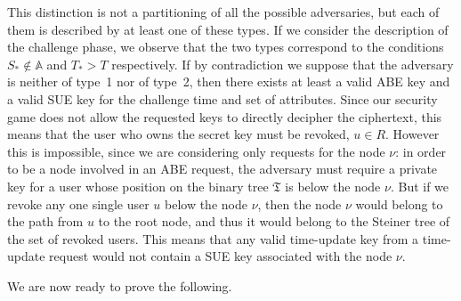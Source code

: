 \documentclass[a4paper,10pt]{article}
\newcommand{\tree}{\mathfrak{T}}
\newcommand{\typeone}{type~1}
\newcommand{\typetwo}{type~2}
\begin{document}
	This distinction is not a partitioning of all the possible adversaries, but each of them is described by at least one of these types. If we consider the description of the challenge phase, we observe that the two types correspond to the conditions $S_*\not\in\mathbb{A}$ and $T_*>T$ respectively. If by contradiction we suppose that the adversary is neither of \typeone{} nor of \typetwo{}, then there exists at least a valid ABE key and a valid SUE key for the challenge time and set of attributes. Since our security game does not allow the requested keys to directly decipher the ciphertext, this means that the user who owns the secret key must be revoked, $u\in R$. However this is impossible, since we are considering only requests for the node $\nu$: in order to be a node involved in an ABE request, the adversary must require a private key for a user whose position on the binary tree $\tree$ is below the node $\nu$. But if we revoke any one single user $u$ below the node $\nu$, then the node $\nu$ would belong to the path from $u$ to the root node, and thus it would belong to the Steiner tree of the set of revoked users. This means that any valid time-update key from a time-update request would not contain a SUE key associated with the node $\nu$.
	
	We are now ready to prove the following.
	
\end{document}
